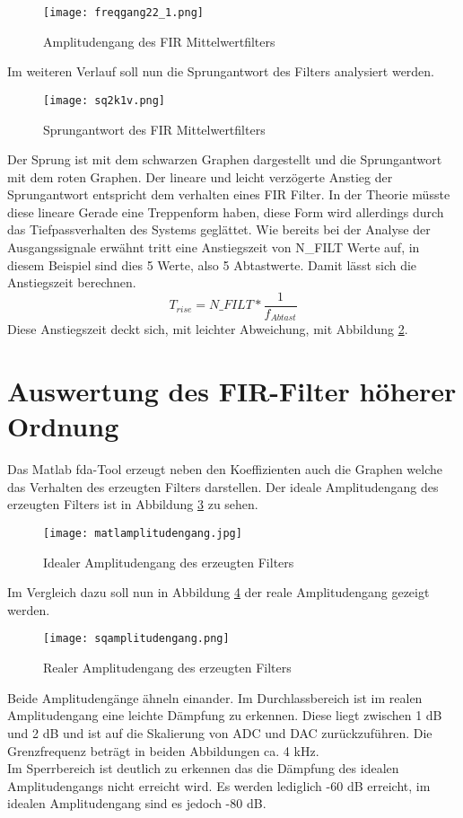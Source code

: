 \begin{figure}[H]
  \centering
    \texttt{[image: freqgang22\_1.png]}
  \caption{Amplitudengang des FIR Mittelwertfilters}
  \label{fig:AmpgangFIRMit}
\end{figure}
Im weiteren Verlauf soll nun die Sprungantwort des Filters analysiert werden.
\begin{figure}[H]
  \centering
    \texttt{[image: sq2k1v.png]}
  \caption{Sprungantwort des FIR Mittelwertfilters}
  \label{fig:SprungFIRMit}
\end{figure}
Der Sprung ist mit dem schwarzen Graphen dargestellt und die Sprungantwort mit dem 
roten Graphen. Der lineare und leicht verzögerte Anstieg der Sprungantwort 
entspricht dem verhalten eines FIR Filter. In der Theorie m\"usste diese lineare 
Gerade eine Treppenform haben, diese Form wird allerdings durch das Tiefpassverhalten 
des Systems gegl\"attet. Wie bereits bei der Analyse der Ausgangssignale 
erw\"ahnt tritt eine Anstiegszeit von N\_FILT Werte auf, in diesem 
Beispiel sind dies 5 Werte, also 5 Abtastwerte. Damit lässt sich die 
Anstiegszeit berechnen.
\begin{equation}
  T_{rise} = N\_FILT * \frac{1}{f_{Abtast}}
\end{equation}
\begin{equation*}
\end{equation*}
Diese Anstiegszeit deckt sich, mit leichter Abweichung, mit Abbildung 
\ref{fig:SprungFIRMit}.

\section{Auswertung des FIR-Filter h\"oherer Ordnung}
Das Matlab \gls{fda}-Tool erzeugt neben den Koeffizienten auch die Graphen 
welche das Verhalten des erzeugten Filters darstellen. Der ideale Amplitudengang des 
erzeugten Filters ist in Abbildung \ref{fig:MatlabAmpgang} zu sehen. 
\begin{figure}[H]
  \centering
    \texttt{[image: matlamplitudengang.jpg]}
  \caption{Idealer Amplitudengang des erzeugten Filters}
  \label{fig:MatlabAmpgang}
\end{figure}
Im Vergleich dazu soll nun in Abbildung \ref{fig:DSPAmpgang} der reale Amplitudengang gezeigt werden.
\begin{figure}[H]
  \centering
    \texttt{[image: sqamplitudengang.png]}
  \caption{Realer Amplitudengang des erzeugten Filters}
  \label{fig:DSPAmpgang}
\end{figure}
Beide Amplitudeng\"ange \"ahneln einander. Im Durchlassbereich ist im realen Amplitudengang eine leichte D\"ampfung zu erkennen. 
Diese liegt zwischen 1 dB und 2 dB und ist auf die Skalierung von ADC und DAC zur\"uckzuf\"uhren.
Die Grenzfrequenz betr\"agt in beiden Abbildungen ca. 4 kHz.\\
Im Sperrbereich ist deutlich zu erkennen das die D\"ampfung des idealen Amplitudengangs nicht erreicht wird. Es werden lediglich -60 dB erreicht, im idealen Amplitudengang sind es jedoch -80 
dB.\\\par


